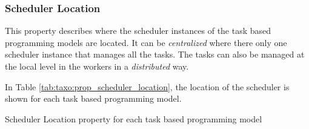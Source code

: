 \subsubsection{Scheduler Location}
This property describes where the scheduler instances of the task based programming models are located.
It can be \textit{centralized} where there only one scheduler instance that manages all the tasks.
The tasks can also be managed at the local level in the workers in a \textit{distributed} way.

In Table \ref{tab:taxo:prop_scheduler_location}, the location of the scheduler is shown for each task based programming model.
\begin{table}[H]
	\caption{Scheduler Location property for each task based programming model \label{tab:taxo:prop_scheduler_location}}
	\centering
	\begin{multicols}{2}
		

		
	\end{multicols}
\end{table}

%	


%
%
%


